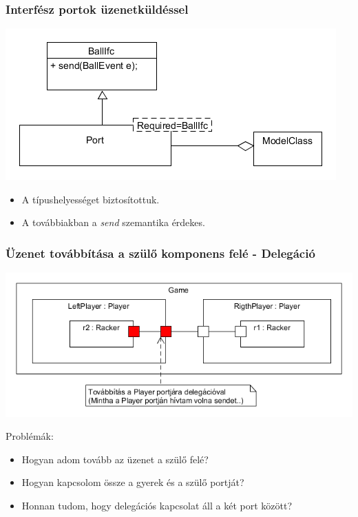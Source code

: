 \documentclass[11pt]{beamer}
\begin{document}
\begin{frame}
	\frametitle{Interfész portok üzenetküldéssel}
	\begin{center}
	\includegraphics[scale=0.5]{vedes_demo_interface_send.png}
	\end{center}
	
	\begin{itemize}
	\item A típushelyességet biztosítottuk.
	\item A továbbiakban a \textit{send} szemantika érdekes.
	\end{itemize}

\end{frame}

\begin{frame}
	\frametitle{Üzenet továbbítása a szülő komponens felé - Delegáció}
	\begin{center}
	\includegraphics[scale=0.5]{vedes_demo_connect.png}
	\end{center}
	
	Problémák:
	\begin{itemize}
	\item Hogyan adom tovább az üzenet a szülő felé?
	\item Hogyan kapcsolom össze a gyerek és a szülő portját?
	\item Honnan tudom, hogy delegációs kapcsolat áll a két port között?
	\end{itemize}

\end{frame}
\end{document}
